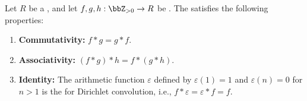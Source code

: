 \begin{proposition} \label{proposition:algebraic_properties_of_dirichlet_convolution}
Let $R$ be a , and let $f, g, h: \bbZ_{>0} \to R$ be . The  satisfies the following properties:
\begin{enumerate}
    \item \textbf{Commutativity:} $f * g = g * f$.
    \item \textbf{Associativity:} $(f * g) * h = f * (g * h)$.
    \item \textbf{Identity:} The arithmetic function $\varepsilon$ defined by $\varepsilon(1) = 1$ and $\varepsilon(n) = 0$ for $n > 1$ is the  for Dirichlet convolution, i.e., $f * \varepsilon = \varepsilon * f = f$.
\end{enumerate}
\end{proposition}

